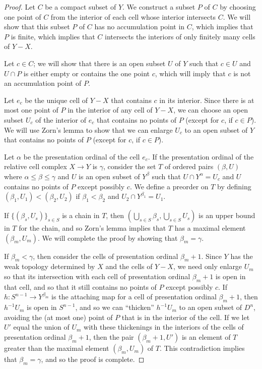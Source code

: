 \documentclass{amsart}
\numberwithin{equation}{section}
\theoremstyle{slplain}
\theoremstyle{definition}
\theoremstyle{remark}
\begin{document}
\begin{proof}
  Let $C$ be a compact subset of $Y$.  We construct a subset $P$ of
  $C$ by choosing one point of $C$ from the interior of each cell
  whose interior intersects $C$.  We will show that this subset $P$ of
  $C$ has no accumulation point in $C$, which implies that $P$ is
  finite, which implies that $C$ intersects the interiors of only
  finitely many cells of $Y-X$.

  Let $c \in C$; we will show that there is an open subset $U$ of $Y$
  such that $c\in U$ and $U\cap P$ is either empty or contains the one
  point $c$, which will imply that $c$ is not an accumulation point of
  $P$.
  
  Let $e_{c}$ be the unique cell of $Y-X$ that contains $c$ in its
  interior.  Since there is at most one point of $P$ in the interior
  of any cell of $Y-X$, we can choose an open subset $U_{c}$ of the
  interior of $e_{c}$ that contains no points of $P$ (except for $c$,
  if $c \in P$). We will use Zorn's lemma to show that we can enlarge
  $U_{c}$ to an open subset of $Y$ that contains no points of $P$
  (except for $c$, if $c \in P$).
  
  Let $\alpha$ be the presentation ordinal of the cell $e_{c}$.  If
  the presentation ordinal of the relative cell complex $X \to Y$ is
  $\gamma$, consider the set $T$ of ordered pairs $(\beta, U)$ where
  $\alpha \le \beta \le \gamma$ and $U$ is an open subset of $Y^\beta$
  such that $U\cap Y^\alpha = U_{c}$ and $U$ contains no points of $P$
  except possibly $c$.  We define a preorder on $T$ by defining
  $(\beta_1, U_1) < (\beta_2, U_2)$ if $\beta_1 < \beta_2$ and
  $U_2\cap Y^{\beta_1} = U_1$.

  If $\{(\beta_s, U_s)\}_{s\in S}$ is a chain in $T$, then
  $(\bigcup_{s\in S} \beta_s, \bigcup_{s\in S}U_s)$ is an upper bound in
  $T$ for the chain, and so Zorn's lemma implies that $T$ has a
  maximal element $(\beta_m, U_m)$.  We will complete the proof by
  showing that $\beta_m = \gamma$.
  
  If $\beta_m < \gamma$, then consider the cells of presentation
  ordinal $\beta_m + 1$.  Since $Y$ has the weak topology determined
  by $X$ and the cells of $Y-X$, we need only enlarge $U_m$ so that
  its intersection with each cell of presentation ordinal $\beta_m +
  1$ is open in that cell, and so that it still contains no points of
  $P$ except possibly $c$.  If $h\colon S^{n-1} \to Y^{\beta_m}$ is
  the attaching map for a cell of presentation ordinal $\beta_m + 1$,
  then $h^{-1}U_m$ is open in $S^{n-1}$, and so we can ``thicken''
  $h^{-1}U_m$ to an open subset of $D^n$, avoiding the (at most one)
  point of $P$ that is in the interior of the cell.  If we let $U'$
  equal the union of $U_m$ with these thickenings in the interiors of
  the cells of presentation ordinal $\beta_m + 1$, then the pair
  $(\beta_m + 1, U')$ is an element of $T$ greater than the maximal
  element $(\beta_m,U_m)$ of $T$.  This contradiction implies that
  $\beta_m = \gamma$, and so the proof is complete.
\end{proof}
\end{document}

